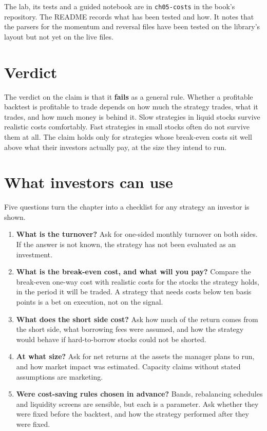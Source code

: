 The lab, its tests and a guided notebook are in \texttt{ch05-costs} in the book's repository. The README records what has been tested and how. It notes that the parsers for the momentum and reversal files have been tested on the library's layout but not yet on the live files.

\section{Verdict}
\label{sec:04-verdict}

The verdict on the claim is that it \textbf{fails} as a general rule. Whether a profitable backtest is profitable to trade depends on how much the strategy trades, what it trades, and how much money is behind it. Slow strategies in liquid stocks survive realistic costs comfortably. Fast strategies in small stocks often do not survive them at all. The claim holds only for strategies whose break-even costs sit well above what their investors actually pay, at the size they intend to run.

\section{What investors can use}
\label{sec:04-investors}

Five questions turn the chapter into a checklist for any strategy an investor is shown.

\begin{enumerate}
  \item \textbf{What is the turnover?} Ask for one-sided monthly turnover on both sides. If the answer is not known, the strategy has not been evaluated as an investment.
  \item \textbf{What is the break-even cost, and what will you pay?} Compare the break-even one-way cost with realistic costs for the stocks the strategy holds, in the period it will be traded. A strategy that needs costs below ten basis points is a bet on execution, not on the signal.
  \item \textbf{What does the short side cost?} Ask how much of the return comes from the short side, what borrowing fees were assumed, and how the strategy would behave if hard-to-borrow stocks could not be shorted.
  \item \textbf{At what size?} Ask for net returns at the assets the manager plans to run, and how market impact was estimated. Capacity claims without stated assumptions are marketing.
  \item \textbf{Were cost-saving rules chosen in advance?} Bands, rebalancing schedules and liquidity screens are sensible, but each is a parameter. Ask whether they were fixed before the backtest, and how the strategy performed after they were fixed.
\end{enumerate}

